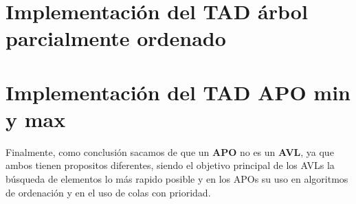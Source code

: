 \section{Implementación del TAD árbol parcialmente ordenado}

\section{Implementación del TAD APO min y max}


Finalmente, como conclusión sacamos de que un \textbf{APO} no es un \textbf{AVL}, ya que ambos tienen propositos diferentes, siendo el objetivo principal de los AVLs la búsqueda de elementos lo más rapido posible y en los APOs su uso en algoritmos de ordenación y en el uso de colas con prioridad.

